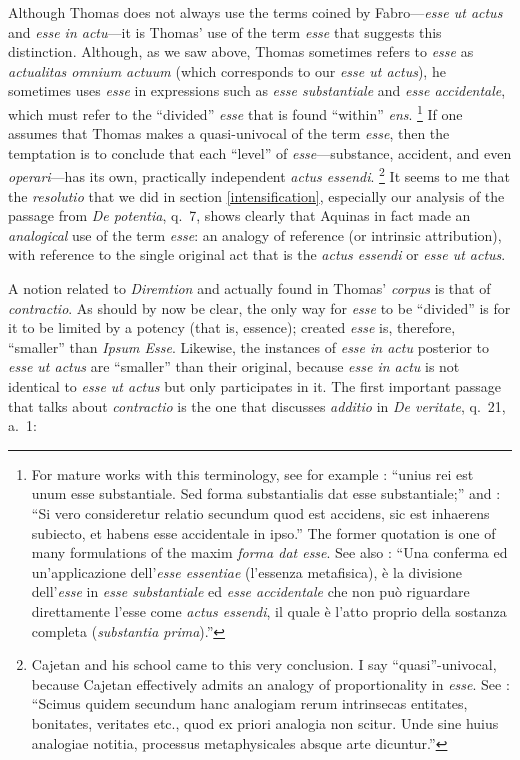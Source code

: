 Although Thomas does not always use the terms coined by Fabro—\emph{esse ut actus} and \emph{esse in actu}—it is Thomas’ use of the term \emph{esse} that suggests this distinction. Although, as we saw above, Thomas sometimes refers to \emph{esse} as \emph{actualitas omnium actuum} (which corresponds to our \emph{esse ut actus}), he sometimes uses \emph{esse} in expressions such as \emph{esse substantiale} and \emph{esse accidentale}, which must refer to the “divided” \emph{esse} that is found “within” \emph{ens}.%
%
\footnote{For mature works with this terminology, see for example \cite[I, q.~76, a.~4, s.c.:]{st:summa}: “unius rei est unum esse substantiale. Sed forma substantialis dat esse substantiale;”  and \cite[I, q.~28, a.~2, co.:]{st:summa}: “Si vero consideretur relatio secundum quod est accidens, sic est inhaerens subiecto, et habens esse accidentale in ipso.” The former quotation is one of many formulations of the maxim \emph{forma dat esse}. See also \cite[199]{fabro:partecipazione}: “Una conferma ed un’applicazione dell’\emph{esse essentiae} (l’essenza metafisica), è la divisione dell’\emph{esse} in \emph{esse substantiale} ed \emph{esse accidentale} che non può riguardare direttamente l’esse come \emph{actus essendi}, il quale è l’atto proprio della sostanza completa (\emph{substantia prima}).”}
%
If one assumes that Thomas makes a quasi-univocal of the term \emph{esse}, then the temptation is to conclude that each “level” of \emph{esse}—substance, accident, and even \emph{operari}—has its own, practically independent \emph{actus essendi}.%
%
\footnote{Cajetan and his school came to this very conclusion. I say “quasi”-univocal, because Cajetan effectively admits an analogy of proportionality in \emph{esse}. See \cite[III, n.~29]{cajetan:denominum}: “Scimus quidem secundum hanc analogiam rerum intrinsecas entitates, bonitates, veritates etc., quod ex priori analogia non scitur. Unde sine huius analogiae notitia, processus metaphysicales absque arte dicuntur.”}
%
It seems to me that the \emph{resolutio} that we did in section \ref{intensification}, especially our analysis of the passage from \emph{De potentia}, q.~7, shows clearly that Aquinas in fact made an \emph{analogical} use of the term \emph{esse}: an analogy of reference (or intrinsic attribution), with reference to the single original act that is the \emph{actus essendi} or \emph{esse ut actus}.

A notion related to \emph{Diremtion} and actually found in Thomas’ \emph{corpus} is that of \emph{contractio}. As should by now be clear, the only way for \emph{esse} to be  “divided” is for it to be limited by a potency (that is, essence); created \emph{esse} is, therefore, “smaller” than \emph{Ipsum Esse}. Likewise, the instances of \emph{esse in actu} posterior to \emph{esse ut actus} are “smaller” than their original, because \emph{esse in actu} is not identical to \emph{esse ut actus} but only participates in it. The first important passage that talks about \emph{contractio} is the one that discusses \emph{additio} in \emph{De veritate}, q.~21, a.~1:

